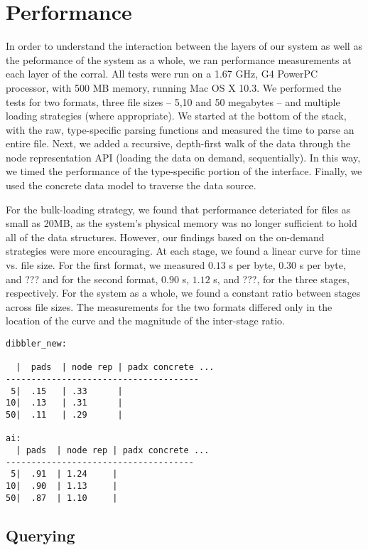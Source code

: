 \section{Performance}
\label{section:performance}

In order to understand the interaction between the layers of our
system as well as the peformance of the system as a whole, we ran
performance measurements at each layer of the corral. All tests were
run on a 1.67 GHz, G4 PowerPC processor, with 500 MB memory, running
Mac OS X 10.3. We performed the tests for two formats, three file
sizes -- 5,10 and 50 megabytes -- and multiple loading strategies
(where appropriate). We started at the bottom of the stack, with the
raw, type-specific parsing functions and measured the time to parse an
entire file. Next, we added a recursive, depth-first walk of the data
through the \padx node representation API (loading the data on demand,
sequentially). In this way, we timed the performance of the
type-specific portion of the \xml interface.  Finally, we used the
\padx concrete data model to traverse the data source.

For the bulk-loading strategy, we found that performance deteriated
for files as small as 20MB, as the system's physical memory was no
longer sufficient to hold all of the data structures. However, our
findings based on the on-demand strategies were more encouraging. At
each stage, we found a linear curve for time vs. file size. For the
first format, we measured $0.13$ {\mu}s per byte, $0.30$ {\mu}s per
byte, and ??? and for the second format, $0.90$ {\mu}s, $1.12$ {\mu}s,
and ???, for the three stages, respectively. For the system as a
whole, we found a constant ratio between stages across file sizes. The
measurements for the two formats differed only in the location of the
curve and the magnitude of the inter-stage ratio.

\begin{verbatim}
dibbler_new:

  |  pads  | node rep | padx concrete ...
--------------------------------------
 5|  .15   | .33      |  
10|  .13   | .31      |
50|  .11   | .29      |

ai:
  | pads  | node rep | padx concrete ...
-------------------------------------
 5|  .91  | 1.24     |  
10|  .90  | 1.13     |
50|  .87  | 1.10     |
\end{verbatim}


\subsection{Querying}

